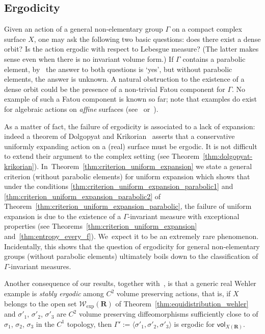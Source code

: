 \documentclass[JEP,XML,SOM,Unicode,published]{cedram}
\def\R{\mathbf{R}}
\newcommand{\cW}{\mathcal{W}}
\newcommand{\vol}{{\mathsf{vol}}}
\theoremstyle{plain}
\theoremstyle{definition}
\begin{document}
\subsection{Ergodicity} \label{subs:intro_ergodicity}
Given an action of a general non-elementary group $\Gamma$ on a compact complex surface $X$,
one may ask the following two basic questions:
does there exist a dense orbit? Is the action ergodic with respect to Lebesgue measure?
(The latter makes sense even when there is no invariant volume form.)
If $\Gamma$ contains a parabolic element, by~\cite{invariant} the answer to both questions is `yes',
but without parabolic elements, the answer is unknown.
A natural obstruction to the existence of
a dense orbit could be the presence of a non-trivial Fatou
component for $\Gamma$. No example of such a Fatou component is known so far;
note that examples do exist for algebraic actions on \emph{affine} surfaces
(see~\cite[\S 4.1]{Cantat:BHPS} or~\cite[Th.\,E]{rebelo-roeder}).

As a matter of fact, the failure of ergodicity is
associated to a lack of expansion: indeed a
theorem of Dolgopyat and Krikorian~\cite[\S 10]{dolgopyat-krikorian}
asserts that a conservative uniformly expanding action on a (real) surface must be ergodic. It is not difficult
to extend their argument to the complex setting (see Theorem~\ref{thm:dolgopyat-krikorian}). In~Theorem~\ref{thm:criterion_uniform_expansion} we state
a general criterion (\ie without parabolic elements) for uniform expansion
which shows that under the conditions \eqref{thm:criterion_uniform_expansion_parabolic1} and \eqref{thm:criterion_uniform_expansion_parabolic2} of
Theorem~\ref{thm:criterion_uniform_expansion_parabolic},
the failure of uniform expansion is due to the existence of a
$\Gamma$-invariant measure with exceptional properties (see Theorems~\ref{thm:criterion_uniform_expansion} and~\ref{thm:entropy_every_f}). We~expect it to be an extremely rare phenomenon.
Incidentally,
this shows that the question of ergodicity for general non-elementary groups (\ie without parabolic elements)
ultimately boils down to the
classification of $\Gamma$-invariant measures.

Another consequence of our results, together with~\cite{dolgopyat-krikorian}, is that
a generic real Wehler example is \emph{stably ergodic} among $C^2$ volume preserving actions, that is,
if $X$ belongs to the open set $ \cW_{\mathrm{exp}}(\R)$
of Theorem~\ref{thm:equidistribution_wehler} and
$\sigma'_1$, $\sigma'_2$, $\sigma'_3$ are $C^2$
volume preserving diffeomorphisms sufficiently close to
of $\sigma_1$, $\sigma_2$, $\sigma_3$ in the $C^1$ topology, then
$\Gamma' := \langle \sigma'_1,\sigma'_2,\sigma'_3\rangle $ is ergodic for $\vol_{X(\R)}$.
\end{document}
